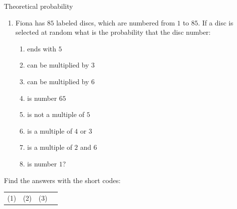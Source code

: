 \begin{exercises}{Theoretical probability}
\begin{enumerate}[itemsep=5pt, label=\textbf{\arabic*}. ]
  \item Fiona has $85$ labeled discs, which are numbered from $1$ to
    $85$. If a disc is selected at random what is the probability that
    the disc number:
    \begin{enumerate}
    \item ends with $5$
    \item can be multiplied by $3$
    \item can be multiplied by $6$
    \item is number $65$
    \item is not a multiple of $5$
    \item is a multiple of $4$ or $3$
    \item is a multiple of $2$ and $6$
    \item is number $1$?
    \end{enumerate}
  \end{enumerate}

  Find the answers with the short codes: \\
  \begin{tabularx}{\textwidth}{XXXX}
    (1) & (2) & (3) \\
  \end{tabularx}
\end{exercises}

